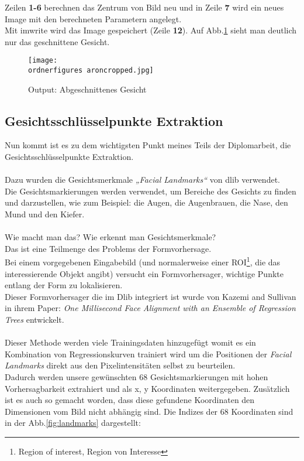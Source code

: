 \justify
Zeilen \textbf{1-6} berechnen das Zentrum von Bild neu und in Zeile \textbf{7} wird ein neues Image mit den berechneten Parametern angelegt.\\
Mit imwrite wird das Image gespeichert (Zeile \textbf{12}). 
Auf Abb.\ref{fig:aroncropped} sieht man deutlich nur das geschnittene Gesicht. \\

\begin{figure}[H]
	\centering
	\texttt{[image: \\ordnerfigures aroncropped.jpg]}
	\caption{Output: Abgeschnittenes Gesicht}
	\label{fig:aroncropped}
\end{figure}

\subsection{Gesichtsschlüsselpunkte Extraktion}
\label{gspex}
\justify
Nun kommt ist es zu dem wichtigsten Punkt meines Teils der Diplomarbeit, die Gesichtsschlüsselpunkte Extraktion. \\\\
Dazu wurden die Gesichtsmerkmale \textit{„Facial Landmarks“} von dlib verwendet. \\
Die Gesichtsmarkierungen werden verwendet, um Bereiche des Gesichts zu finden und darzustellen, wie zum Beispiel: die Augen, die Augenbrauen, die Nase, den Mund und den Kiefer. \\\\
Wie macht man das? Wie erkennt man Gesichtsmerkmale? \\Das ist eine Teilmenge des Problems der Formvorhersage.\\ Bei einem vorgegebenen Eingabebild (und normalerweise einer ROI\footnote{Region of interest, Region von Interesse}, die das interessierende Objekt angibt) versucht ein Formvorhersager, wichtige Punkte entlang der Form zu lokalisieren. \\
Dieser Formvorhersager die im Dlib integriert ist wurde von Kazemi and Sullivan in ihrem Paper: \textit{One Millisecond Face Alignment with an Ensemble of Regression Trees} entwickelt. \\\\
Dieser Methode werden viele Trainingsdaten hinzugefügt womit es ein Kombination von Regressionskurven trainiert wird um die Positionen der \textit{Facial Landmarks} direkt aus den Pixelintensitäten selbst zu beurteilen.\cite{Kazemi2014OneMF} \\

\justify
Dadurch werden unsere gewünschten 68 Gesichtsmarkierungen mit hohen Vorhersagbarkeit extrahiert und als x, y Koordinaten weitergegeben. 
Zusätzlich ist es auch so gemacht worden, dass diese gefundene Koordinaten den Dimensionen vom Bild nicht abhängig sind. 
Die Indizes der 68 Koordinaten sind in der Abb.\ref{fig:landmarks} dargestellt: \\

